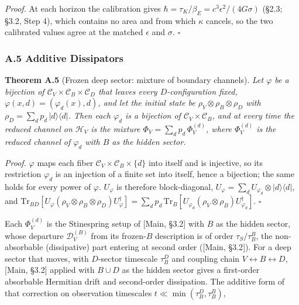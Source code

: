 \documentclass[
]{article}
\begin{document}
\emph{Proof.} At each horizon the calibration gives
\(\hbar=\tau_K/\beta_E=c^3\epsilon^2/(4G\sigma)\) (§2.3; §3.2, Step 4),
which contains no area and from which \(\kappa\) cancels, so the two
calibrated values agree at the matched \(\epsilon\) and \(\sigma\).
\(\square\)

\hypertarget{a.5-additive-dissipators}{%
\subsubsection{A.5 Additive
Dissipators}\label{a.5-additive-dissipators}}

\textbf{Theorem A.5} (Frozen deep sector: mixture of boundary channels).
\emph{Let \(\varphi\) be a bijection of
\(\mathcal{C}_V \times \mathcal{C}_B \times \mathcal{C}_D\) that leaves
every \(D\)-configuration fixed, \(\varphi(x, d) = (\varphi_d(x), d)\),
and let the initial state be \(\rho_V \otimes \rho_B \otimes \rho_D\)
with \(\rho_D = \sum_d p_d\,|d\rangle\langle d|\). Then each
\(\varphi_d\) is a bijection of \(\mathcal{C}_V \times \mathcal{C}_B\),
and at every time the reduced channel on \(\mathcal{H}_V\) is the
mixture \(\Phi_V = \sum_d p_d\,\Phi_V^{(d)}\), where \(\Phi_V^{(d)}\) is
the reduced channel of \(\varphi_d\) with \(B\) as the hidden sector.}

\emph{Proof.} \(\varphi\) maps each fiber
\(\mathcal{C}_V \times \mathcal{C}_B \times \{d\}\) into itself and is
injective, so its restriction \(\varphi_d\) is an injection of a finite
set into itself, hence a bijection; the same holds for every power of
\(\varphi\). \(U_\varphi\) is therefore block-diagonal,
\(U_\varphi = \sum_d U_{\varphi_d} \otimes |d\rangle\langle d|\), and
\(\text{Tr}_{BD}[U_\varphi(\rho_V \otimes \rho_B \otimes \rho_D)U_\varphi^\dagger] = \sum_d p_d\,\text{Tr}_B[U_{\varphi_d}(\rho_V \otimes \rho_B)U_{\varphi_d}^\dagger]\).
\(\square\)

Each \(\Phi_V^{(d)}\) is the Stinespring setup of {[}Main, §3.2{]} with
\(B\) as the hidden sector, whose departure \(\mathcal{D}_V^{(B)}\) from
its frozen-\(B\) description is of order \(\tau_S/\tau_B^B\), the
non-absorbable (dissipative) part entering at second order ({[}Main,
§3.2{]}). For a deep sector that moves, with \(D\)-sector timescale
\(\tau_B^D\) and coupling chain
\(V \leftrightarrow B \leftrightarrow D\), {[}Main, §3.2{]} applied with
\(B \cup D\) as the hidden sector gives a first-order absorbable
Hermitian drift and second-order dissipation. The additive form of that
correction on observation timescales \(t \ll \min(\tau_B^D, \tau_B^B)\),
\end{document}
